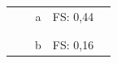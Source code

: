 \begin{table}[H]
\begin{tabular*}{\columnwidth}{@{\extracolsep{\fill}}clcrl}
                                           &                                                                                                            & a          & FS: 0,44         &                                                                                                                                                                                                                                                                                                                                                                                                                                                                           \\
                                           &                                                                                                            &            &                  &                                                                                                                                                                                                                                                                                                                                                                                                                                                                           \\
                                           &                                                                                                            &            &                  &                                                                                                                                                                                                                                                                                                                                                                                                                                                                           \\
                                           &                                                                                                            & b          & FS: 0,16         &                                                                                                                                                                                                                                                                                                                                                                                                                                                                           \\

\end{tabular*}
\end{table}
